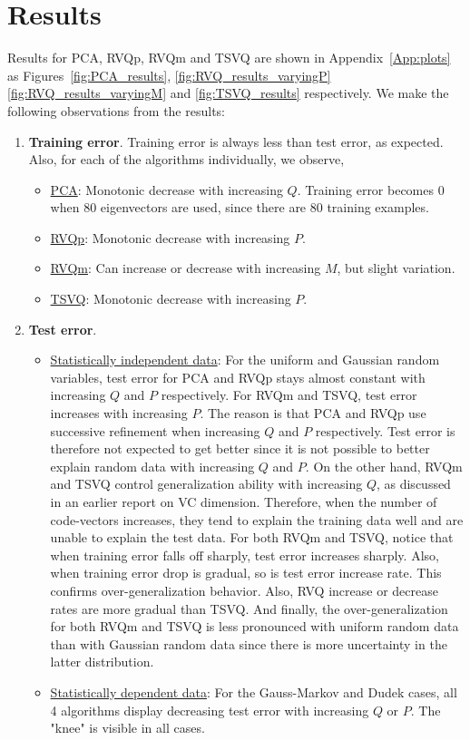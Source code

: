\section{Results}
Results for PCA, RVQp, RVQm and TSVQ are shown in Appendix~\ref{App:plots} as Figures~\ref{fig:PCA_results}, \ref{fig:RVQ_results_varyingP} \ref{fig:RVQ_results_varyingM} and \ref{fig:TSVQ_results} respectively.
We make the following observations from the results:
\begin{enumerate}
\item \textbf{Training error}. Training error is always less than test error, as expected. Also, for each of the algorithms individually, we observe,
\begin{itemize}
\item \underline{PCA}: Monotonic decrease with increasing $Q$. Training error becomes 0 when 80 eigenvectors are used, since there are 80 training examples.
\item \underline{RVQp}: Monotonic decrease with increasing $P$.
\item \underline{RVQm}: Can increase or decrease with increasing $M$, but slight variation.
\item \underline{TSVQ}: Monotonic decrease with increasing $P$.
\end{itemize}
\item \textbf{Test error}.
\begin{itemize}
\item \underline{Statistically independent data}: For the uniform and Gaussian random variables, test error for PCA and RVQp stays almost constant with increasing $Q$ and $P$ respectively. For RVQm and TSVQ, test error increases with increasing $P$. The reason is that PCA and RVQp use successive refinement when increasing $Q$ and $P$ respectively. Test error is therefore not expected to get better since it is not possible to better explain random data with increasing $Q$ and $P$.
On the other hand, RVQm and TSVQ control generalization ability with increasing $Q$, as discussed in an earlier report on VC dimension. Therefore, when the number of code-vectors increases, they tend to explain the training data well and are unable to explain the test data. For both RVQm and TSVQ, notice that when training error falls off sharply, test error increases sharply. Also, when training error drop is gradual, so is test error increase rate. This confirms over-generalization behavior. Also, RVQ increase or decrease rates are more gradual than TSVQ. And finally, the over-generalization for both RVQm and TSVQ is less pronounced with uniform random data than with Gaussian random data since there is more uncertainty in the latter distribution.
\item \underline{Statistically dependent data}: For the Gauss-Markov and Dudek cases, all 4 algorithms display decreasing test error with increasing $Q$ or $P$. The "knee" is visible in all cases.
\end{itemize}
\end{enumerate}
